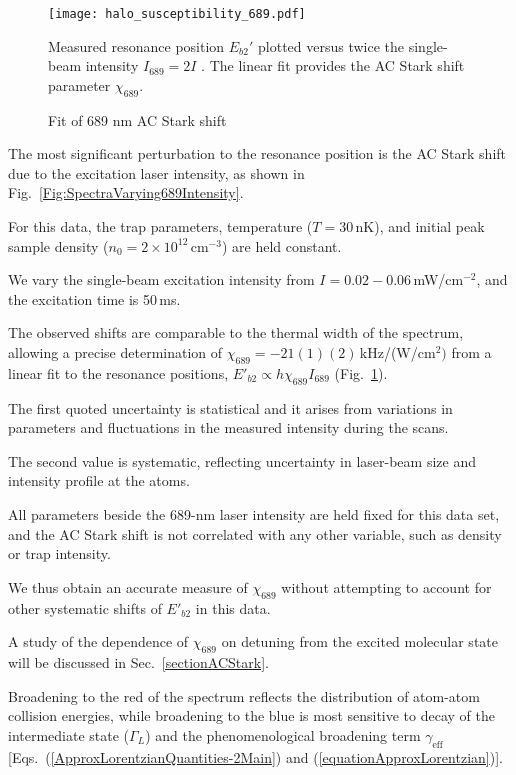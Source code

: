 	\begin{figure}
	\centerline{
	  \texttt{[image: halo\_susceptibility\_689.pdf]}}
	  \caption{Fit of 689 nm AC Stark shift}{Measured resonance position $E_{b2}'$ plotted versus twice the single-beam intensity $I_{689}=2I$ . The linear fit provides the AC Stark shift parameter $\chi_{689}$.}
	  \label{Fig:ShiftWith689Intensity}
	\end{figure}

The most significant perturbation to the resonance position is the AC Stark shift due to the excitation laser intensity, as shown in Fig.\ \ref{Fig:SpectraVarying689Intensity}.

For this data, the trap parameters, temperature ($T=30$\,nK), and initial peak sample density ($n_0=2\times 10^{12}$\,cm$^{-3}$) are held constant.

We vary the single-beam excitation intensity from $I=0.02-0.06$\,mW/cm$^{-2}$, and the excitation time is 50\,ms.

The observed shifts are comparable to the thermal width of the spectrum, allowing a precise determination of $\chi_{689}=-21(1)(2)$\,kHz/(W/cm$^{2})$ from a linear fit to the resonance positions, $E'_{b2}\propto h\chi_{689} I_{689}$ (Fig.\ \ref{Fig:ShiftWith689Intensity}).

The first quoted uncertainty is statistical and it arises from variations in parameters and fluctuations in the measured intensity during the scans.

The second value is systematic, reflecting uncertainty in laser-beam size and intensity profile at the atoms.

All parameters beside the 689-nm laser intensity are held fixed for this data set, and the AC Stark shift is not correlated with any other variable, such as density or trap intensity.

We thus obtain an accurate measure of $\chi_{689}$ without attempting to account for other systematic shifts of $E'_{b2}$ in this data.

A study of the dependence of $\chi_{689}$ on detuning from the excited molecular state will be discussed in Sec.\ \ref{sectionACStark}.

Broadening to the red of the spectrum reflects the distribution of atom-atom collision energies, while broadening to the blue is most sensitive to decay of the intermediate state ($\Gamma_L$) and the phenomenological broadening term $\gamma_{\text{eff}}$ [Eqs.\ (\ref{ApproxLorentzianQuantities-2Main}) and (\ref{equationApproxLorentzian})]. 

